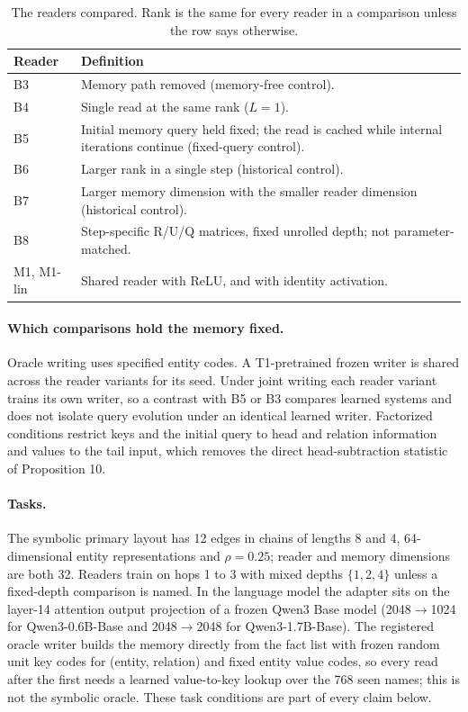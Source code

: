 \begin{table}[htbp]
\centering\small
\caption{The readers compared. Rank is the same for every reader in a comparison unless the row says otherwise.}
\label{tab:readers}
\begin{tabular}{@{}lp{9.5cm}@{}}
\toprule
Reader & Definition \\
\midrule
B3 & Memory path removed (memory-free control). \\
B4 & Single read at the same rank ($L=1$). \\
B5 & Initial memory query held fixed; the read is cached while internal iterations continue (fixed-query control). \\
B6 & Larger rank in a single step (historical control). \\
B7 & Larger memory dimension with the smaller reader dimension (historical control). \\
B8 & Step-specific R/U/Q matrices, fixed unrolled depth; not parameter-matched. \\
M1, M1-lin & Shared reader with ReLU, and with identity activation. \\
\bottomrule
\end{tabular}
\end{table}

\paragraph{Which comparisons hold the memory fixed.}
Oracle writing uses specified entity codes.  %
A T1-pretrained frozen writer is shared across the reader variants for its seed.  %
Under joint writing each reader variant trains its own writer, so a contrast with B5 or B3 compares learned systems and does not isolate query evolution under an identical learned writer.  %
Factorized conditions restrict keys and the initial query to head and relation information and values to the tail input, which removes the direct head-subtraction statistic of Proposition 10.  %

\paragraph{Tasks.}
The symbolic primary layout has 12 edges in chains of lengths 8 and 4, 64-dimensional entity representations and $\rho=0.25$; reader and memory dimensions are both 32.  %
Readers train on hops 1 to 3 with mixed depths $\{1,2,4\}$ unless a fixed-depth comparison is named.  %
In the language model the adapter sits on the layer-14 attention output projection of a frozen Qwen3 Base model (2048$\rightarrow$1024 for Qwen3-0.6B-Base and 2048$\rightarrow$2048 for Qwen3-1.7B-Base).  %
The registered oracle writer builds the memory directly from the fact list with frozen random unit key codes for (entity, relation) and fixed entity value codes, so every read after the first needs a learned value-to-key lookup over the 768 seen names; this is not the symbolic oracle.  %
These task conditions are part of every claim below.

